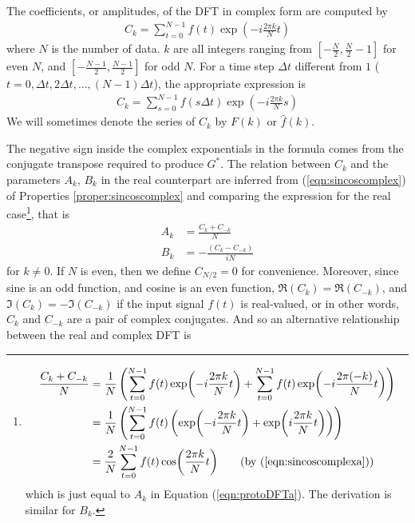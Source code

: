 \begin{defn}
\label{defn:complexDFT}
The coefficients, or amplitudes, of the DFT in complex form are computed by
\begin{align}
C_k = \sum_{t=0}^{N-1} f(t)\exp(-i\frac{2\pi k}{N}t) \label{eqn:complexDFTCk}
\end{align}
where $N$ is the number of data. $k$ are all integers ranging from $[-\frac{N}{2}, \frac{N}{2}-1]$ for even $N$, and $[-\frac{N-1}{2}, \frac{N-1}{2}]$ for odd $N$. For a time step $\Delta t$ different from $1$ ($t = 0, \Delta t, 2\Delta t, \ldots, (N-1)\Delta t$), the appropriate expression is
\begin{align}
C_k = \sum_{s=0}^{N-1} f(s\Delta t)\exp(-i\frac{2\pi k}{N}s)
\end{align}
We will sometimes denote the series of $C_k$ by $F(k)$ or $\hat{f}(k)$.
\end{defn}
The negative sign inside the complex exponentials in the formula comes from the conjugate transpose required to produce $G^*$. The relation between $C_k$ and the parameters $A_k$, $B_k$ in the real counterpart are inferred from (\ref{eqn:sincoscomplex}) of Properties \ref{proper:sincoscomplex} and comparing the expression for the real case\footnote{\begin{align*}
\frac{C_k + C_{-k}}{N} &= \frac{1}{N}\left(\sum_{t=0}^{N-1} f(t)\exp(-i\frac{2\pi k}{N}t) + \sum_{t=0}^{N-1} f(t)\exp(-i\frac{2\pi (-k)}{N}t)\right) \\ 
&= \frac{1}{N}\left(\sum_{t=0}^{N-1} f(t)\left(\exp(-i\frac{2\pi k}{N}t) + \exp(i\frac{2\pi k}{N}t)\right)\right) \\
&= \frac{2}{N} \sum_{t=0}^{N-1} f(t) \cos(\frac{2\pi k}{N}t) \qquad \text{(by (\ref{eqn:sincoscomplexa}))}
\end{align*}
which is just equal to $A_k$ in Equation (\ref{eqn:protoDFTa}). The derivation is similar for $B_k$.}, that is
\begin{subequations}
\begin{align}
A_k &= \frac{C_k + C_{-k}}{N} \\
B_k &= -\frac{(C_k - C_{-k})}{iN}
\end{align}    
\end{subequations}
for $k \neq 0$. If $N$ is even, then we define $C_{N/2} = 0$ for convenience. Moreover, since sine is an odd function, and cosine is an even function, $\Re(C_k) = \Re(C_{-k})$, and $\Im(C_k) = -\Im(C_{-k})$ if the input signal $f(t)$ is real-valued, or in other words, $C_k$ and $C_{-k}$ are a pair of complex conjugates. And so an alternative relationship between the real and complex DFT is
